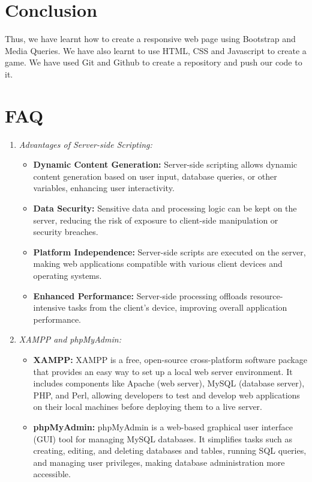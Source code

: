 \documentclass[11pt]{article}
\begin{document}
\section{Conclusion}
Thus, we have learnt how to create a responsive web page using Bootstrap and Media Queries. We have also learnt to use HTML, CSS and Javascript to create a game. We have used Git and Github to create a repository and push our code to it.
\clearpage

\section{FAQ}
\begin{enumerate}
    \item \textit{Advantages of Server-side Scripting:}
    \begin{itemize}
        \item \textbf{Dynamic Content Generation:} Server-side scripting allows dynamic content generation based on user input, database queries, or other variables, enhancing user interactivity.
        \item \textbf{Data Security:} Sensitive data and processing logic can be kept on the server, reducing the risk of exposure to client-side manipulation or security breaches.
        \item \textbf{Platform Independence:} Server-side scripts are executed on the server, making web applications compatible with various client devices and operating systems.
        \item \textbf{Enhanced Performance:} Server-side processing offloads resource-intensive tasks from the client's device, improving overall application performance.
    \end{itemize}
    
    \item \textit{XAMPP and phpMyAdmin:}
    \begin{itemize}
        \item \textbf{XAMPP:} XAMPP is a free, open-source cross-platform software package that provides an easy way to set up a local web server environment. It includes components like Apache (web server), MySQL (database server), PHP, and Perl, allowing developers to test and develop web applications on their local machines before deploying them to a live server.
        \item \textbf{phpMyAdmin:} phpMyAdmin is a web-based graphical user interface (GUI) tool for managing MySQL databases. It simplifies tasks such as creating, editing, and deleting databases and tables, running SQL queries, and managing user privileges, making database administration more accessible.
    \end{itemize}
    

\end{enumerate}
\end{document}
